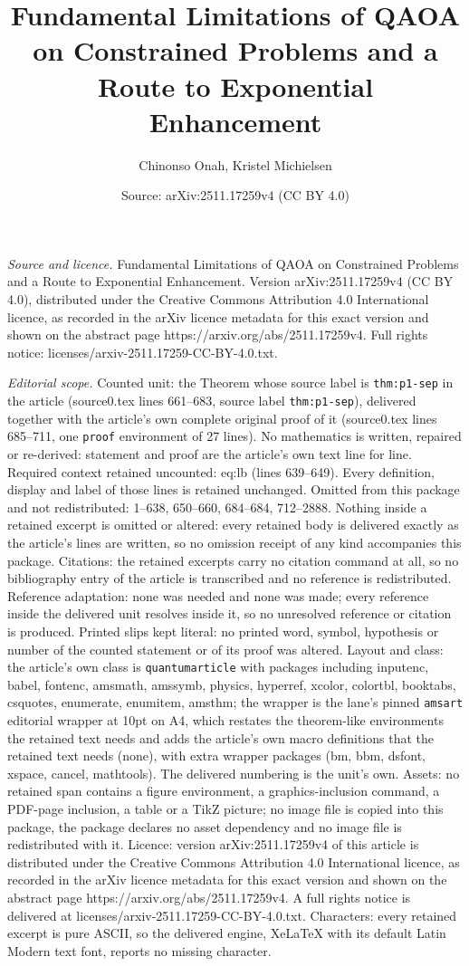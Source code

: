 \documentclass[10pt,a4paper]{amsart}
\title[Fundamental Limitations of QAOA on Constrained Problems and ]{Fundamental Limitations of QAOA on Constrained Problems and a Route to Exponential Enhancement}
\author{Chinonso Onah, Kristel Michielsen}
\date{Source: arXiv:2511.17259v4 (CC BY 4.0)}
\begin{document}
\maketitle

\noindent\emph{Source and licence.} Fundamental Limitations of QAOA on Constrained Problems and a Route to Exponential Enhancement. Version arXiv:2511.17259v4 (CC BY 4.0), distributed under the Creative Commons Attribution 4.0 International licence, as recorded in the arXiv licence metadata for this exact version and shown on the abstract page https://arxiv.org/abs/2511.17259v4. Full rights notice: licenses/arxiv-2511.17259-CC-BY-4.0.txt.\par\smallskip

\noindent\textit{Editorial scope.} Counted unit: the Theorem whose source label is \texttt{thm:p1-sep} in the article (source0.tex lines 661--683, source label \texttt{thm:p1-sep}), delivered together with the article's own complete original proof of it (source0.tex lines 685--711, one \texttt{proof} environment of 27 lines). No mathematics is written, repaired or re-derived: statement and proof are the article's own text line for line. Required context retained uncounted: eq:lb (lines 639--649). Every definition, display and label of those lines is retained unchanged. Omitted from this package and not redistributed: 1--638, 650--660, 684--684, 712--2888. Nothing inside a retained excerpt is omitted or altered: every retained body is delivered exactly as the article's lines are written, so no omission receipt of any kind accompanies this package. Citations: the retained excerpts carry no citation command at all, so no bibliography entry of the article is transcribed and no reference is redistributed. Reference adaptation: none was needed and none was made; every reference inside the delivered unit resolves inside it, so no unresolved reference or citation is produced. Printed slips kept literal: no printed word, symbol, hypothesis or number of the counted statement or of its proof was altered. Layout and class: the article's own class is \texttt{quantumarticle} with packages including inputenc, babel, fontenc, amsmath, amssymb, physics, hyperref, xcolor, colortbl, booktabs, csquotes, enumerate, enumitem, amsthm; the wrapper is the lane's pinned \texttt{amsart} editorial wrapper at 10pt on A4, which restates the theorem-like environments the retained text needs and adds the article's own macro definitions that the retained text needs (none), with extra wrapper packages (bm, bbm, dsfont, xspace, cancel, mathtools). The delivered numbering is the unit's own. Assets: no retained span contains a figure environment, a graphics-inclusion command, a PDF-page inclusion, a table or a TikZ picture; no image file is copied into this package, the package declares no asset dependency and no image file is redistributed with it. Licence: version arXiv:2511.17259v4 of this article is distributed under the Creative Commons Attribution 4.0 International licence, as recorded in the arXiv licence metadata for this exact version and shown on the abstract page https://arxiv.org/abs/2511.17259v4. A full rights notice is delivered at licenses/arxiv-2511.17259-CC-BY-4.0.txt. Characters: every retained excerpt is pure ASCII, so the delivered engine, XeLaTeX with its default Latin Modern text font, reports no missing character.
\end{document}
